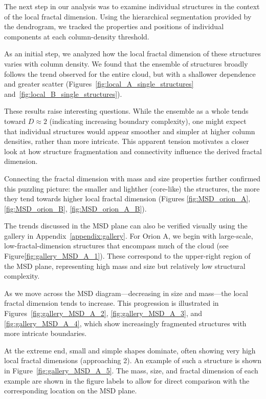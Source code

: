 The next step in our analysis was to examine individual structures in the context of the local fractal dimension.  
Using the hierarchical segmentation provided by the dendrogram, we tracked the properties and positions of individual components at each column-density threshold.

As an initial step, we analyzed how the local fractal dimension of these structures varies with column density.  
We found that the ensemble of structures broadly follows the trend observed for the entire cloud, but with a shallower dependence and greater scatter (Figures~\ref{fig:local_A_single_structures} and~\ref{fig:local_B_single_structures}).  

These results raise interesting questions.  
While the ensemble as a whole tends toward \(D \approx 2\) (indicating increasing boundary complexity), one might expect that individual structures would appear smoother and simpler at higher column densities, rather than more intricate.  
This apparent tension motivates a closer look at how structure fragmentation and connectivity influence the derived fractal dimension.

Connecting the fractal dimension with mass and size properties further confirmed this puzzling picture: the smaller and lighther (core-like) the structures, the more they tend towards higher local fractal dimension (Figures \ref{fig:MSD_orion_A}, \ref{fig:MSD_orion_B}, \ref{fig:MSD_orion_A_B}).

The trends discussed in the MSD plane can also be verified visually using the gallery in Appendix~\ref{appendix:gallery}.
For Orion A, we begin with large-scale, low-fractal-dimension structures that encompass much of the cloud (see Figure\ref{fig:gallery_MSD_A_1}). These correspond to the upper-right region of the MSD plane, representing high mass and size but relatively low structural complexity.

As we move across the MSD diagram—decreasing in size and mass—the local fractal dimension tends to increase.
This progression is illustrated in Figures~\ref{fig:gallery_MSD_A_2}, \ref{fig:gallery_MSD_A_3}, and \ref{fig:gallery_MSD_A_4}, which show increasingly fragmented structures with more intricate boundaries.

At the extreme end, small and simple shapes dominate, often showing very high local fractal dimensions (approaching 2).
An example of such a structure is shown in Figure~\ref{fig:gallery_MSD_A_5}.
The mass, size, and fractal dimension of each example are shown in the figure labels to allow for direct comparison with the corresponding location on the MSD plane.

